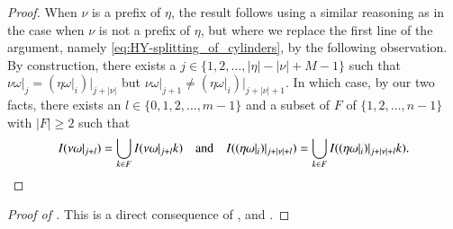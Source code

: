 \documentclass[a4paper,reqno,10pt]{amsart}
\begin{document}
\begin{proof}
When $\nu$ is a prefix of $\eta$, the result follows using a similar reasoning as in the case  when $\nu$ is not a prefix of $\eta$, but where we replace the first line of the argument, namely \eqref{eq:HY-splitting_of_cylinders}, by the following observation. By construction, there exists a $j \in \{ 1, 2, \ldots, \lvert \eta \rvert - \lvert \nu \rvert + M -1 \}$ such that $\nu \omega\vert_{j} = (\eta \omega\vert_{i})\vert_{j + \lvert \nu \rvert}$ but $\nu \omega\vert_{j+1} \neq (\eta \omega\vert_{i})\vert_{j + \lvert \nu \rvert + 1}$.  In which case, by our two facts, there exists an $l \in \{0, 1, 2, \ldots, m-1\}$ and a subset of $F$ of $\{1, 2, \ldots, n-1\}$ with $\lvert F \rvert \geq 2$ such that
    \[
        I(\nu \omega\vert_{j+l}) = \bigcup_{k \in F} 
        I(\nu \omega\vert_{j+l} k)
        \quad \text{and} \quad
        I((\eta \omega\vert_{i})\vert_{j + \lvert \nu \rvert + l}) = \bigcup_{k \in F} I((\eta \omega\vert_{i})\vert_{j + \lvert \nu \rvert +l} k).
        \qedhere
    \]
\end{proof}

\begin{proof}[{Proof of }]
This is a direct consequence of , and .
\end{proof}



\end{document}

